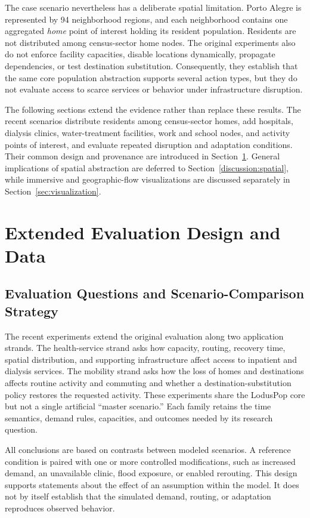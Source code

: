 \documentclass[pdflatex,sn-mathphys-num]{sn-jnl}%
\theoremstyle{thmstyleone}%
\theoremstyle{thmstyletwo}%
\theoremstyle{thmstylethree}%
\begin{document}
The case scenario nevertheless has a deliberate spatial limitation. Porto Alegre is represented by 94 neighborhood regions, and each neighborhood contains one aggregated \textit{home} point of interest holding its resident population. Residents are not distributed among census-sector home nodes. The original experiments also do not enforce facility capacities, disable locations dynamically, propagate dependencies, or test destination substitution. Consequently, they establish that the same core population abstraction supports several action types, but they do not evaluate access to scarce services or behavior under infrastructure disruption.

The following sections extend the evidence rather than replace these results. The recent scenarios distribute residents among census-sector homes, add hospitals, dialysis clinics, water-treatment facilities, work and school nodes, and activity points of interest, and evaluate repeated disruption and adaptation conditions. Their common design and provenance are introduced in Section~\ref{sec:extended_evaluation}. General implications of spatial abstraction are deferred to Section~\ref{discussion:spatial}, while immersive and geographic-flow visualizations are discussed separately in Section~\ref{sec:visualization}.
\endgroup

\section{Extended Evaluation Design and Data}
\label{sec:extended_evaluation}

\subsection{Evaluation Questions and Scenario-Comparison Strategy}

The recent experiments extend the original evaluation along two application strands. The health-service strand asks how capacity, routing, recovery time, spatial distribution, and supporting infrastructure affect access to inpatient and dialysis services. The mobility strand asks how the loss of homes and destinations affects routine activity and commuting and whether a destination-substitution policy restores the requested activity. These experiments share the LodusPop core but not a single artificial ``master scenario.'' Each family retains the time semantics, demand rules, capacities, and outcomes needed by its research question.

All conclusions are based on contrasts between modeled scenarios. A reference condition is paired with one or more controlled modifications, such as increased demand, an unavailable clinic, flood exposure, or enabled rerouting. This design supports statements about the effect of an assumption within the model. It does not by itself establish that the simulated demand, routing, or adaptation reproduces observed behavior.
\end{document}
